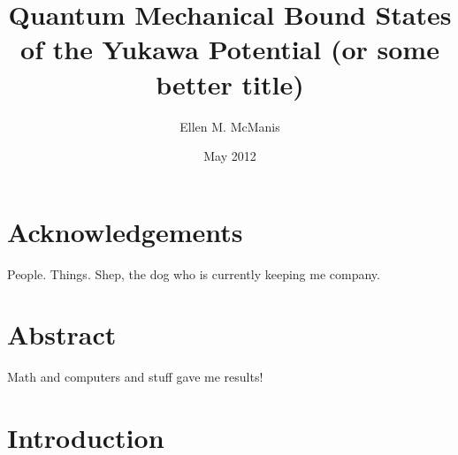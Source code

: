 \documentclass[12pt,twoside]{reedthesis}
\title{Quantum Mechanical Bound States of the Yukawa Potential (or some better title)}
\author{Ellen M. McManis}
\date{May 2012}
\begin{document}
  \maketitle
  \frontmatter %
  \pagestyle{empty} %

    \chapter*{Acknowledgements}
	People. Things. Shep, the dog who is currently keeping me company.


    \tableofcontents
    \listoftables
    \listoffigures

    \chapter*{Abstract}
	Math and computers and stuff gave me results!
		

  \mainmatter %
  \pagestyle{fancyplain} %


    \chapter*{Introduction}
\end{document}
